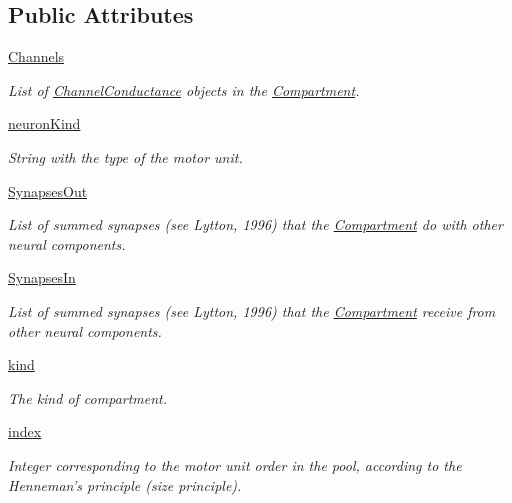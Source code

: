 \subsection*{Public Attributes}
\begin{DoxyCompactItemize}
\item 
\hyperlink{class_compartment_1_1_compartment_aa444563be9598d7cc54fd8d10ea6a04f}{Channels}
\begin{DoxyCompactList}\small\item\em List of \hyperlink{namespace_channel_conductance}{Channel\-Conductance} objects in the \hyperlink{class_compartment_1_1_compartment}{Compartment}. \end{DoxyCompactList}\item 
\hyperlink{class_compartment_1_1_compartment_ad42f32769afd94d1e7d7d54008efb6fa}{neuron\-Kind}
\begin{DoxyCompactList}\small\item\em String with the type of the motor unit. \end{DoxyCompactList}\item 
\hyperlink{class_compartment_1_1_compartment_a85d64ebf548276c873501d2dc3489ceb}{Synapses\-Out}
\begin{DoxyCompactList}\small\item\em List of summed synapses (see Lytton, 1996) that the \hyperlink{class_compartment_1_1_compartment}{Compartment} do with other neural components. \end{DoxyCompactList}\item 
\hyperlink{class_compartment_1_1_compartment_abe41aff3bffed80f4b848bd14763d506}{Synapses\-In}
\begin{DoxyCompactList}\small\item\em List of summed synapses (see Lytton, 1996) that the \hyperlink{class_compartment_1_1_compartment}{Compartment} receive from other neural components. \end{DoxyCompactList}\item 
\hyperlink{class_compartment_1_1_compartment_a74f2266a2231c4a81cc680bc201f0ffd}{kind}
\begin{DoxyCompactList}\small\item\em The kind of compartment. \end{DoxyCompactList}\item 
\hyperlink{class_compartment_1_1_compartment_a9402ef46ede52521ebbb9e9d2d68d631}{index}
\begin{DoxyCompactList}\small\item\em Integer corresponding to the motor unit order in the pool, according to the Henneman's principle (size principle). \end{DoxyCompactList}\item 

\end{DoxyCompactItemize}
